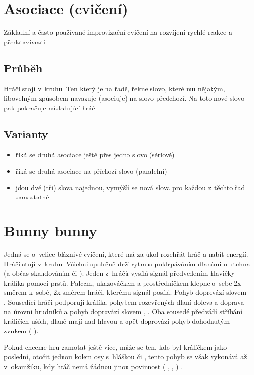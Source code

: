\needspace{5cm} \section{Asociace (cvičení)} \label{asociace (cvičení)} Základní a často používané improvizační cvičení na rozvíjení rychlé reakce a představivosti. 
 
\subsection{Průběh} Hráči stojí v~kruhu. Ten který je na řadě, řekne slovo, které mu nějakým, libovolným způsobem navazuje (asociuje) na slovo předchozí. Na toto nové slovo pak pokračuje následující hráč. 
 
\subsection{Varianty} \begin{itemize}
\item říká se druhá asociace ještě přes jedno slovo (sériové)
\item říká se druhá asociace na příchozí slovo (paralelní)
\item jdou dvě (tři) slova najednou, vymýšlí se nová slova pro každou z~těchto řad samostatně.
\end{itemize}
 
 
 
 
 
 
 
\needspace{5cm} \section{Bunny bunny} \label{bunny bunny} Jedná se o~velice bláznivé cvičení, které má za úkol rozehřát hráč a nabít energií. Hráči stojí v~kruhu. Všichni společně drží rytmus poklepáváním dlaněmi o~stehna (a občas skandováním   či   ). Jeden z~hráčů vysílá signál předvedením hlavičky králíka pomocí prstů. Palcem, ukazováčkem a prostředníčkem klepne o~sebe 2x směrem k~sobě, 2x směrem hráči, kterému signál posílá. Pohyb doprovází slovem  . Sousedící hráči podporují králíka pohybem rozevřených dlaní doleva a doprava na úrovni hrudníků a pohyb doprovází slovem  ,  . Oba sousedé předvádí stříhání králičích uších, dlaně mají nad hlavou a opět doprovází pohyb dohodnutým zvukem ( ). 
 
Pokud chceme hru zamotat ještě více, může se ten, kdo byl králíčkem jako poslední, otočit jednou kolem osy s~hláškou   či  , tento pohyb se však vykonává až v~okamžiku, kdy hráč nemá žádnou jinou povinnost ( ,  ,  ) . 
 
